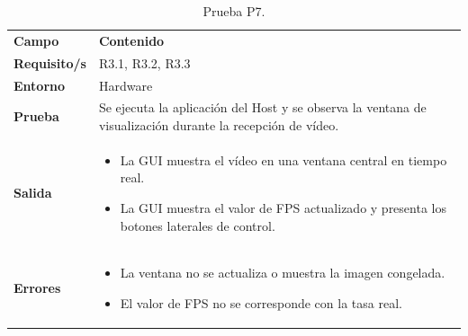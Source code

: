 \documentclass[../main.tex]{subfiles}
\begin{document}
\begin{table}[H]
\centering
\caption{Prueba P7.}
\label{tab:prueba_p7}
\begin{tabular}{>{\raggedright\arraybackslash}p{2.5cm}>{\raggedright\arraybackslash}p{11cm}}
\rowcolor[HTML]{156082}
{\color{white}\textbf{Campo}} & {\color{white}\textbf{Contenido}} \\
\rowcolor[HTML]{C0E6F5}
\textbf{Requisito/s} & R3.1, R3.2, R3.3 \\
\textbf{Entorno} & Hardware \\
\rowcolor[HTML]{C0E6F5}
\textbf{Prueba} & Se ejecuta la aplicación del Host y se observa la ventana de visualización durante la recepción de vídeo. \\
\textbf{Salida} & \begin{itemize}\setlength{\itemsep}{0pt}
    \item La GUI muestra el vídeo en una ventana central en tiempo real.
    \item La GUI muestra el valor de FPS actualizado y presenta los botones laterales de control.
\end{itemize} \\
\rowcolor[HTML]{C0E6F5}
\textbf{Errores} & \begin{itemize}\setlength{\itemsep}{0pt}
    \item La ventana no se actualiza o muestra la imagen congelada.
    \item El valor de FPS no se corresponde con la tasa real.
\end{itemize} \\
\end{tabular}
\end{table}
\end{document}
